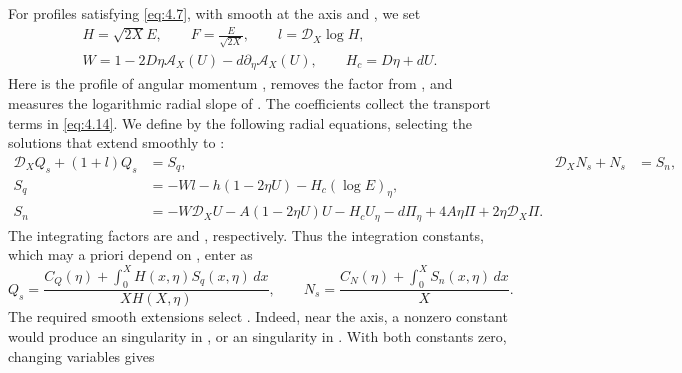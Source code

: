 For profiles satisfying \eqref{eq:4.7}, with
 smooth at the axis and
, we set
\begin{equation}
\begin{gathered}
 H=\sqrt{2X}E,\qquad F=\frac{E}{\sqrt{2X}},\qquad l=\mathcal D_X\log H,\\
 W=1-2D\eta\mathcal A_X(U)-d\partial_\eta\mathcal A_X(U),
 \qquad H_c=D\eta+dU.
\end{gathered}
\tag{4.8}\label{eq:4.8}
\end{equation}
Here  is the profile of angular momentum
,
 removes the factor
 from , and
 measures the logarithmic radial slope of
. The coefficients
 collect the transport terms in \eqref{eq:4.14}.
We define  by the following radial equations,
selecting the solutions that extend smoothly to :
\begin{equation}
\begin{aligned}
 \mathcal D_XQ_s+(1+l)Q_s&=S_q,& \mathcal D_XN_s+N_s&=S_n,\\
 S_q&=-Wl-h(1-2\eta U)-H_c(\log E)_\eta,\\
 S_n&=-W\mathcal D_XU-A(1-2\eta U)U-H_cU_\eta
      -d\Pi_\eta+4A\eta\Pi+2\eta \mathcal D_X\Pi.
\end{aligned}
\tag{4.9}\label{eq:4.9}
\end{equation}
The integrating factors are  and
, respectively. Thus the integration constants, which
may a priori depend on , enter as
\begin{equation}
 Q_s=\frac{C_Q(\eta)+\int_0^X H(x,\eta)S_q(x,\eta)\,dx}{XH(X,\eta)},
 \qquad
 N_s=\frac{C_N(\eta)+\int_0^X S_n(x,\eta)\,dx}{X}.
\tag{4.10}\label{eq:4.10}
\end{equation}
The required smooth extensions select
. Indeed,
 near the axis, a nonzero constant would
produce an  singularity in
, or an  singularity in
. With both constants zero, changing variables
 gives
